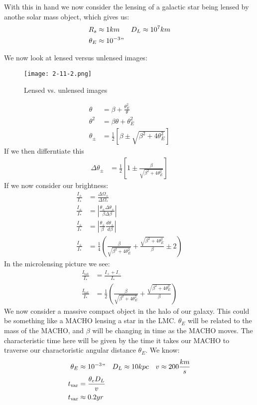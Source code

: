 With this in hand we now consider the lensing of a galactic star being lensed by anothe solar mass object, which gives us:
\begin{align*}
	R_s &\approx 1km & D_L &\approx 10^7 km \\
	\theta_E &\approx 10^{-3}"
\end{align*}

We now look at lensed versus unlensed images:
\begin{figure*}[h]
	\centering
	\texttt{[image: 2-11-2.png]}
	\caption*{Lensed vs. unlensed images}
\end{figure*}
\begin{align*}
	\theta &= \beta + \frac{\theta_E^2}{\theta} \\
	\theta^2 &= \beta\theta + \theta_E^2 \\
	\theta_\pm &= \frac{1}{2}\left[\beta\pm\sqrt{\beta^2 + 4\theta_E^2}\right]
\end{align*}
If we then differntiate this
\begin{align*}
	\Delta\theta_\pm &= \frac{1}{2}\left[1\pm\frac{\beta}{\sqrt{\beta^2 + 4\theta_E^2}}\right]
\end{align*}
If we now consider our brightness:
\begin{align*}
	\frac{I_\pm}{I_*} &= \frac{\Delta\Omega_\pm}{\Delta\Omega_*} \\
	\frac{I_\pm}{I_*} &= |\frac{\theta_\pm \Delta\theta_\pm}{\beta\Delta\beta}| \\
	\frac{I_\pm}{I_*} &= |\frac{\theta_\pm}{\beta} \frac{d\theta_\pm}{d\beta}| \\
	\frac{I_\pm}{I_*} &= \frac{1}{4}\left(\frac{\beta}{\sqrt{\beta^2 + 4\theta_E^2}} + \frac{\sqrt{\beta^2 + 4\theta_E^2}}{\beta} \pm 2\right)
\end{align*}
In the microlensing picture we see:
\begin{align*}
	\frac{I_\text{tot}}{I_*} &= \frac{I_+ + I_-}{I_*} \\
	\frac{I_\text{tot}}{I_*} &= \frac{1}{2}\left(\frac{\beta}{\sqrt{\beta^2 + 4\theta_E^2}} + \frac{\sqrt{\beta^2 + 4\theta_E^2}}{\beta}\right)
\end{align*}
We now consider a massive compact object in the halo of our galaxy. This could be something like a MACHO lensing a star in the LMC.
$\theta_E$ will be related to the mass of the MACHO, and $\beta$ will be changing in time as the MACHO moves.
The characteristic time here will be given by the time it takes our MACHO to traverse our charactoristic angular distance $\theta_E$.
We know:
\begin{align*}
	\theta_E &\approx 10^{-3} "& D_L &\approx 10 kpc & v &\approx 200 \frac{km}{s} \\
	t_\text{var} &= \frac{\theta_e D_L}{v} \\
	t_\text{var} &\approx 0.2 yr
\end{align*}

